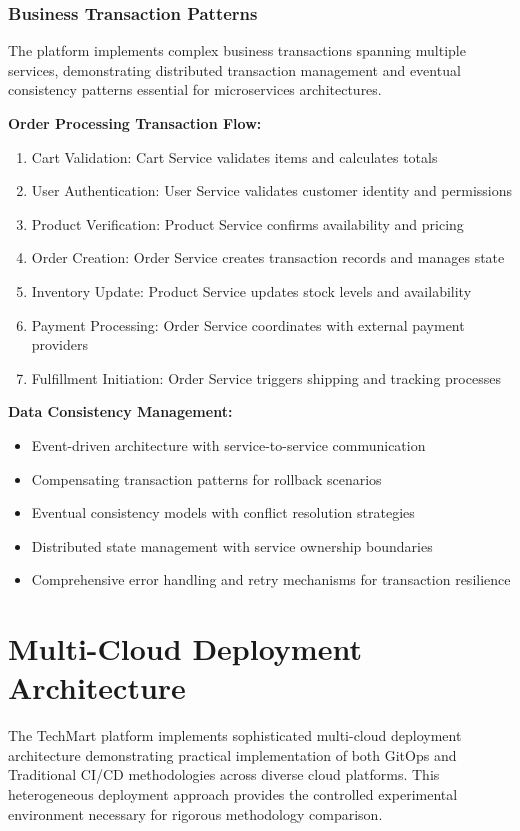 \subsubsection{Business Transaction Patterns}

The platform implements complex business transactions spanning multiple services, demonstrating distributed transaction management and eventual consistency patterns essential for microservices architectures.

\textbf{Order Processing Transaction Flow:}
\begin{enumerate}
\item Cart Validation: Cart Service validates items and calculates totals
\item User Authentication: User Service validates customer identity and permissions
\item Product Verification: Product Service confirms availability and pricing
\item Order Creation: Order Service creates transaction records and manages state
\item Inventory Update: Product Service updates stock levels and availability
\item Payment Processing: Order Service coordinates with external payment providers
\item Fulfillment Initiation: Order Service triggers shipping and tracking processes
\end{enumerate}

\textbf{Data Consistency Management:}
\begin{itemize}
\item Event-driven architecture with service-to-service communication
\item Compensating transaction patterns for rollback scenarios
\item Eventual consistency models with conflict resolution strategies
\item Distributed state management with service ownership boundaries
\item Comprehensive error handling and retry mechanisms for transaction resilience
\end{itemize}

\section{Multi-Cloud Deployment Architecture}

The TechMart platform implements sophisticated multi-cloud deployment architecture demonstrating practical implementation of both GitOps and Traditional CI/CD methodologies across diverse cloud platforms. This heterogeneous deployment approach provides the controlled experimental environment necessary for rigorous methodology comparison.

